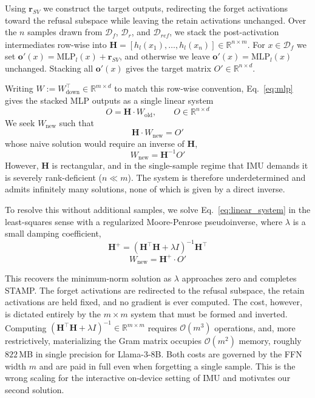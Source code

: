 Using $\mathbf{r}_{\textit{SV}}$ we construct the target outputs, redirecting the forget activations toward the refusal subspace while leaving the retain activations unchanged. Over the $n$ samples drawn from $\mathcal{D}_f$, $\mathcal{D}_r$, and $\mathcal{D}_{\textit{ref}}$, we stack the post-activation intermediates row-wise into $\mathbf{H} = [h_l(x_1), \ldots, h_l(x_n)] \in \mathbb{R}^{n \times m}$. For $x \in \mathcal{D}_f$ we set $\mathbf{o}'(x) = \mathrm{MLP}_l(x) + \mathbf{r}_{\textit{SV}}$, and otherwise we leave $\mathbf{o}'(x) = \mathrm{MLP}_l(x)$ unchanged. Stacking all $\mathbf{o}'(x)$ gives the target matrix $O' \in \mathbb{R}^{n \times d}$.

Writing $W := W_{\mathrm{down}}^{\top} \in \mathbb{R}^{m \times d}$ to match this row-wise convention, Eq.~\eqref{eq:mlp} gives the stacked MLP outputs as a single linear system
\begin{equation}
O = \mathbf{H} \cdot W_{\mathrm{old}}, \qquad O \in \mathbb{R}^{n \times d}
\end{equation}
We seek $W_{\mathrm{new}}$ such that
\begin{equation}
\mathbf{H} \cdot W_{\mathrm{new}} = O'
\label{eq:linear_system}
\end{equation}
whose naive solution would require an inverse of $\mathbf{H}$,
\begin{equation}
W_{\mathrm{new}} = \mathbf{H}^{-1} O'
\end{equation}
However, $\mathbf{H}$ is rectangular, and in the single-sample regime that IMU demands it is severely rank-deficient ($n \ll m$). The system is therefore underdetermined and admits infinitely many solutions, none of which is given by a direct inverse. 


To resolve this without additional samples, we solve Eq.~\eqref{eq:linear_system} in the least-squares sense with a regularized Moore-Penrose pseudoinverse, where $\lambda$ is a small damping coefficient,
\begin{equation}
\mathbf{H}^{+} = (\mathbf{H}^\top \mathbf{H} + \lambda I)^{-1} \mathbf{H}^\top
\end{equation}
\begin{equation}
W_{\mathrm{new}} = \mathbf{H}^{+} \cdot O'
\end{equation}

This recovers the minimum-norm solution as $\lambda$ approaches zero and completes STAMP. The forget activations are redirected to the refusal subspace, the retain activations are held fixed, and no gradient is ever computed. The cost, however, is dictated entirely by the $m \times m$ system that must be formed and inverted. Computing $(\mathbf{H}^\top \mathbf{H} + \lambda I)^{-1} \in \mathbb{R}^{m \times m}$ requires $\mathcal{O}(m^3)$ operations, and, more restrictively, materializing the Gram matrix occupies $\mathcal{O}(m^2)$ memory, roughly $822$\,MB in single precision for Llama-3-8B. Both costs are governed by the FFN width $m$ and are paid in full even when forgetting a single sample. This is the wrong scaling for the interactive on-device setting of IMU and motivates our second solution.

